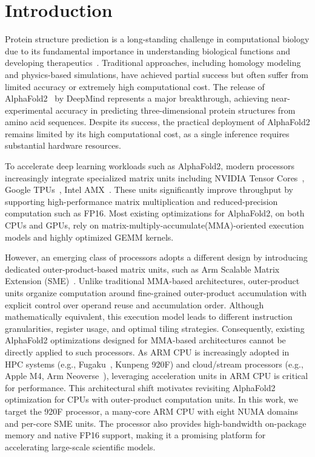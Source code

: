 \section{Introduction}

Protein structure prediction is a long-standing challenge in computational biology due to its fundamental importance in understanding biological functions and developing therapeutics~\cite{anfinsen1973principles, watson2023rfdiffusion}. Traditional approaches, including homology modeling and physics-based simulations, have achieved partial success but often suffer from limited accuracy or extremely high computational cost. The release of AlphaFold2~\cite{jumper2021highly,evans2021protein} by DeepMind represents a major breakthrough, achieving near-experimental accuracy in predicting three-dimensional protein structures from amino acid sequences. 
 Despite its success, the practical deployment of AlphaFold2 remains limited by its high computational cost, as a single inference requires substantial hardware resources.

To accelerate deep learning workloads such as AlphaFold2, modern processors increasingly integrate specialized matrix units including NVIDIA Tensor Cores~\cite{tensorcore}, Google TPUs~\cite{googletpu}, Intel AMX~\cite{intel2022amx}. These units significantly improve throughput by supporting high-performance matrix multiplication and reduced-precision computation such as FP16. Most existing optimizations for AlphaFold2, on both CPUs and GPUs, rely on matrix-multiply-accumulate(MMA)-oriented execution models and highly optimized GEMM kernels.


However, an emerging class of processors adopts a different design by introducing dedicated outer-product-based matrix units, such as Arm Scalable Matrix Extension (SME)~\cite{weidmann2021introducing}. Unlike traditional MMA-based architectures, outer-product units organize computation around fine-grained outer-product accumulation with explicit control over operand reuse and accumulation order. Although mathematically equivalent, this execution model leads to different instruction granularities, register usage, and optimal tiling strategies. Consequently, existing AlphaFold2 optimizations designed for MMA-based architectures cannot be directly applied to such processors. As ARM CPU is increasingly adopted in HPC systems (e.g., Fugaku~\cite{sato2020codesign}, Kunpeng 920F) and cloud/stream processors (e.g., Apple M4, Arm Neoverse~\cite{pellegrini2020neoverse}), leveraging acceleration units in ARM CPU is critical for performance.
This architectural shift motivates revisiting AlphaFold2 optimization for CPUs with outer-product computation units. In this work, we target the 920F processor, a many-core ARM CPU with eight NUMA domains and per-core SME units. The processor also provides high-bandwidth on-package memory and native FP16 support, making it a promising platform for accelerating large-scale scientific models.

